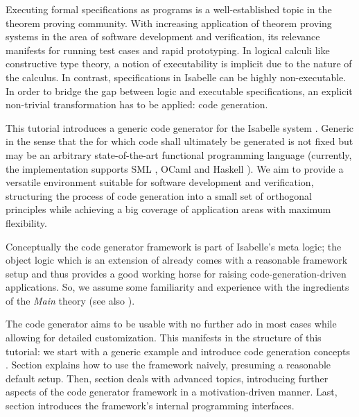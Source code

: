 %
\begin{isabellebody}%
\def\isabellecontext{Codegen}%
%
\isadelimtheory
\isanewline
\isanewline
%
\endisadelimtheory
%
\isatagtheory
%
\endisatagtheory
{\isafoldtheory}%
%
\isadelimtheory
%
\endisadelimtheory
%
\isadelimML
%
\endisadelimML
%
\isatagML
%
\endisatagML
{\isafoldML}%
%
\isadelimML
%
\endisadelimML
%
\isamarkuptrue%
%
\isamarkuptrue%
%
\isamarkuptrue%
%
\begin{isamarkuptext}%
Executing formal specifications as programs is a well-established
  topic in the theorem proving community.  With increasing
  application of theorem proving systems in the area of
  software development and verification, its relevance manifests
  for running test cases and rapid prototyping.  In logical
  calculi like constructive type theory,
  a notion of executability is implicit due to the nature
  of the calculus.  In contrast, specifications in Isabelle
  can be highly non-executable.  In order to bridge
  the gap between logic and executable specifications,
  an explicit non-trivial transformation has to be applied:
  code generation.

  This tutorial introduces a generic code generator for the
  Isabelle system \cite{isa-tutorial}.
  Generic in the sense that the
   for which code shall ultimately be
  generated is not fixed but may be an arbitrary state-of-the-art
  functional programming language (currently, the implementation
  supports SML \cite{SML}, OCaml \cite{OCaml} and Haskell
  \cite{haskell-revised-report}).
  We aim to provide a
  versatile environment
  suitable for software development and verification,
  structuring the process
  of code generation into a small set of orthogonal principles
  while achieving a big coverage of application areas
  with maximum flexibility.

  Conceptually the code generator framework is part
  of Isabelle's  meta logic; the object logic
   which is an extension of 
  already comes with a reasonable framework setup and thus provides
  a good working horse for raising code-generation-driven
  applications.  So, we assume some familiarity and experience
  with the ingredients of the  \emph{Main} theory
  (see also \cite{isa-tutorial}).%
\end{isamarkuptext}%
\isamarkuptrue%
%
\isamarkuptrue%
%
\begin{isamarkuptext}%
The code generator aims to be usable with no further ado
  in most cases while allowing for detailed customization.
  This manifests in the structure of this tutorial:
  we start with a generic example 
  and introduce code generation concepts .
  Section
   explains how to use the framework naively,
  presuming a reasonable default setup.  Then, section
   deals with advanced topics,
  introducing further aspects of the code generator framework
  in a motivation-driven manner.  Last, section 
  introduces the framework's internal programming interfaces.


\end{isamarkuptext}
\end{isabellebody}
